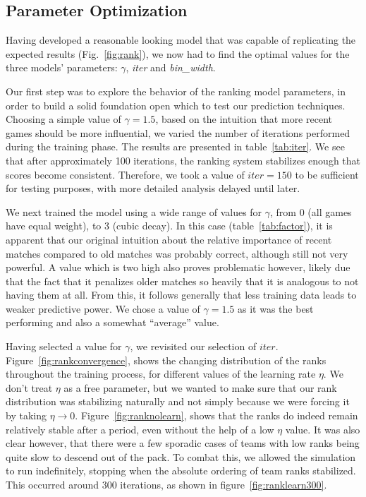 \documentclass{llncs}
\begin{document}
\subsection{Parameter Optimization}
Having developed a reasonable looking model that was capable of replicating the expected results (Fig.~\ref{fig:rank}), we now had to find the optimal values for the three models' parameters: $\gamma$, \emph{iter} and \emph{bin\_width}.

Our first step was to explore the behavior of the ranking model parameters, in order to build a solid foundation open which to test our prediction techniques. Choosing a simple value of $\gamma = 1.5$, based on the intuition that more recent games should be more influential, we varied the number of iterations performed during the training phase. The results are presented in table~\ref{tab:iter}. We see that after approximately 100 iterations, the ranking system stabilizes enough that scores become consistent. Therefore, we took a value of $iter = 150$ to be sufficient for testing purposes, with more detailed analysis delayed until later.

We next trained the model using a wide range of values for $\gamma$, from 0 (all games have equal weight), to 3 (cubic decay). In this case (table~\ref{tab:factor}), it is apparent that our original intuition about the relative importance of recent matches compared to old matches was probably correct, although still not very powerful. A value which is two high also proves problematic however, likely  due that the fact that it penalizes older matches so heavily that it is analogous to not having them at all. From this, it follows generally that less training data leads to weaker predictive power. We chose a value of $\gamma = 1.5$ as it was the best performing and also a somewhat ``average'' value.

Having selected a value for $\gamma$, we revisited our selection of $iter$. Figure~\ref{fig:rankconvergence}, shows the changing distribution of the ranks throughout the training process, for different values of the learning rate $\eta$. We don't treat $\eta$ as a free parameter, but we wanted to make sure that our rank distribution was stabilizing naturally and not simply because we were forcing it by taking $\eta \to 0$. Figure~\ref{fig:ranknolearn}, shows that the ranks do indeed remain relatively stable after a period, even without the help of a low $\eta$ value. It was also clear however, that there were a few sporadic cases of teams with low ranks being quite slow to descend out of the pack. To combat this, we allowed the simulation to run indefinitely, stopping when the absolute ordering of team ranks stabilized. This occurred around 300 iterations, as shown in figure~\ref{fig:ranklearn300}.
\end{document}
